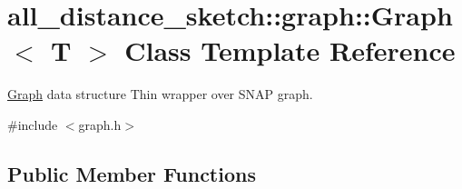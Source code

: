 \hypertarget{classall__distance__sketch_1_1graph_1_1Graph}{}\section{all\+\_\+distance\+\_\+sketch\+:\+:graph\+:\+:Graph$<$ T $>$ Class Template Reference}
\label{classall__distance__sketch_1_1graph_1_1Graph}


\hyperlink{classall__distance__sketch_1_1graph_1_1Graph}{Graph} data structure Thin wrapper over S\+N\+A\+P graph.  




{\ttfamily \#include $<$graph.\+h$>$}

\subsection*{Public Member Functions}
